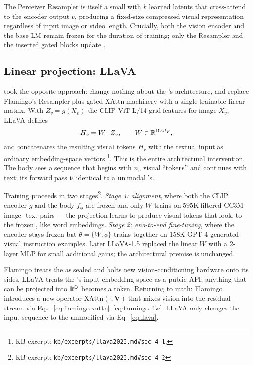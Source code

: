 The Perceiver Resampler is itself a small  with $k$ learned
 latents that cross-attend to the encoder output $v$, producing a
fixed-size compressed visual representation regardless of input image
or video length. Crucially, both the vision encoder and the base LM
remain frozen for the duration of training; only the Resampler and the
inserted gated  blocks update
\citep[\S 2.1]{alayrac2022-flamingo}.

\subsection{Linear projection: LLaVA}
\label{sec:multimodal-llava}

\citet{llava2023} took the opposite approach: change nothing about the
's architecture, and replace Flamingo's Resampler-plus-gated-XAttn
machinery with a single trainable linear matrix. With $Z_v = g(X_v)$
the CLIP ViT-L/14 grid features for image $X_v$, LLaVA defines
\begin{equation}
H_v = W \cdot Z_v, \qquad W \in \mathbb{R}^{\mathsf{D} \times d_V}, \label{eq:llava}
\end{equation}
and concatenates the resulting visual tokens $H_v$ with the textual
input as ordinary embedding-space vectors%
\footnote{KB excerpt: \texttt{kb/excerpts/llava2023.md\#sec-4-1}, }.
This is the entire architectural intervention. The  body sees a
sequence that begins with $n_v$ visual ``tokens'' and continues with
text; its forward pass is identical to a unimodal 's.

Training proceeds in two stages\footnote{KB excerpt:
\texttt{kb/excerpts/llava2023.md\#sec-4-2}}. \emph{Stage 1: 
alignment}, where both the CLIP encoder $g$ and the  body $f_\phi$
are frozen and only $W$ trains on $595\text{K}$ filtered CC3M image-
text pairs --- the projection learns to produce visual tokens that
look, to the frozen , like word embeddings. \emph{Stage 2:
end-to-end fine-tuning}, where the encoder stays frozen but
$\theta = \{W, \phi\}$ trains together on $158\text{K}$ GPT-4-generated
visual instruction examples. Later LLaVA-1.5 replaced the linear $W$
with a 2-layer MLP for small additional gains; the architectural
premise is unchanged.

\begin{analogy}
Flamingo treats the  as sealed and bolts new vision-conditioning
hardware onto its sides. LLaVA treats the 's input-embedding space
as a public API: anything that can be projected into $\mathbb{R}^{\mathsf{D}}$
becomes a token. Returning to math: Flamingo introduces a new operator
$\mathrm{XAttn}(\cdot, \mathbf{V})$ that mixes vision into the residual
stream via Eqs.~\eqref{eq:flamingo-xattn}--\eqref{eq:flamingo-ffw};
LLaVA only changes the input sequence to the unmodified  via
Eq.~\eqref{eq:llava}.
\end{analogy}

